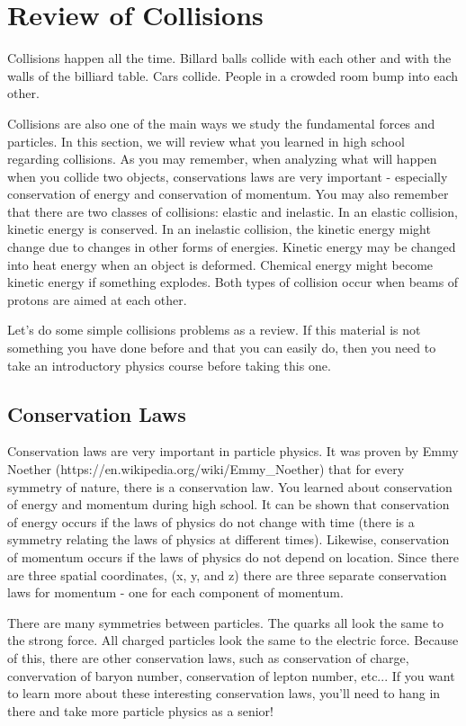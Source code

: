 \section{Review of Collisions}

Collisions happen all the time.  Billard balls collide with each other and with the walls of the billiard table.  Cars collide.  People in a crowded room bump into each other.

Collisions are also one of the main ways we study the fundamental forces and particles. In this section, we will review what you learned in high school regarding collisions.  As you may remember, when analyzing what will happen when you collide two objects, conservations laws are very important - especially conservation of energy and conservation of momentum.  You may also remember that there are two classes of collisions: elastic and inelastic.  In an elastic collision, kinetic energy is conserved. In an inelastic collision, the kinetic energy might change due to changes in other forms of energies. Kinetic energy may be changed into heat energy when an object is deformed. Chemical energy might become kinetic energy if something explodes. Both types of collision occur when beams of protons are aimed at each other.

Let's do some simple collisions problems as a review.  If this material is not something you have done before and that you can easily do, then you need to take an introductory physics course before taking this one.

\subsection{Conservation Laws}
Conservation laws are very important in particle physics.  It was proven by Emmy Noether 
(https://en.wikipedia.org/wiki/Emmy\_Noether) 
that for every symmetry of nature, there is a conservation law.  You learned about conservation of energy and momentum during high school. It can be shown that conservation of energy occurs if the laws of physics do not change with time (there is a symmetry relating the laws of physics at different times).  Likewise, conservation of momentum occurs if the laws of physics do not depend on location. Since there are three spatial coordinates, (x, y, and z) there are three separate conservation laws for momentum - one for each component of momentum. 

There are many symmetries between particles. The quarks all look the same to the strong force. All charged particles look the same to the electric force.  Because of this, there are other conservation laws, such as conservation of charge, convervation of baryon number, conservation of lepton number, etc... If you want to learn more about these interesting conservation laws, you'll need to hang in there and take more particle physics as a senior! 


